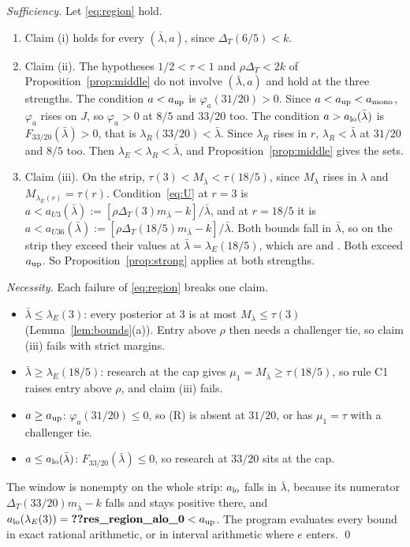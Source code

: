 \documentclass[12pt]{article}
\theoremstyle{definition}
\theoremstyle{remark}
\newcommand{\DT}{\Delta_T}
\newcommand{\lb}{\bar\lambda}
\begin{document}
\emph{Sufficiency.} Let \eqref{eq:region} hold.
\begin{enumerate}[nosep]
\item Claim (i) holds for every $(\lb,a)$, since $\DT(6/5)<k$.
\item Claim (ii). The hypotheses $1/2<\tau<1$ and $\rho\DT<2k$ of Proposition~\ref{prop:middle} do not involve
  $(\lb,a)$ and hold at the three strengths. The condition $a<a_{\rm up}$ is $\varphi_a(31/20)>0$. Since
  $a<a_{\rm up}<a_{\rm mono}$, $\varphi_a$ rises on $J$, so $\varphi_a>0$ at $8/5$ and $33/20$ too. The condition
  $a>a_{\rm lo}(\lb)$ is $F_{33/20}(\lb)>0$, that is $\lambda_R(33/20)<\lb$. Since $\lambda_R$ rises in $r$,
  $\lambda_R<\lb$ at $31/20$ and $8/5$ too. Then $\lambda_E<\lambda_R<\lb$, and Proposition~\ref{prop:middle} gives the
  sets.
\item Claim (iii). On the strip, $\tau(3)<M_{\lb}<\tau(18/5)$, since $M_\lambda$ rises in $\lambda$ and
  $M_{\lambda_E(r)}=\tau(r)$. Condition~\eqref{eq:U} at $r=3$ is $a<a_{U3}(\lb):=[\rho\DT(3)m_{\lb}-k]/\lb$, and at
  $r=18/5$ it is $a<a_{U36}(\lb):=[\rho\DT(18/5)m_{\lb}-k]/\lb$. Both bounds fall in $\lb$, so on the strip they
  exceed their values at $\lb=\lambda_E(18/5)$, which are  and . Both
  exceed $a_{\rm up}$. So Proposition~\ref{prop:strong} applies at both strengths.
\end{enumerate}

\emph{Necessity.} Each failure of \eqref{eq:region} breaks one claim.
\begin{itemize}[nosep]
\item $\lb\le\lambda_E(3)$: every posterior at $3$ is at most $M_{\lb}\le\tau(3)$ (Lemma~\ref{lem:bounds}(a)). Entry
  above $\rho$ then needs a challenger tie, so claim (iii) fails with strict margins.
\item $\lb\ge\lambda_E(18/5)$: research at the cap gives $\mu_1=M_{\lb}\ge\tau(18/5)$, so rule C1 raises entry above
  $\rho$, and claim (iii) fails.
\item $a\ge a_{\rm up}$: $\varphi_a(31/20)\le0$, so (R) is absent at $31/20$, or has $\mu_1=\tau$ with a challenger
  tie.
\item $a\le a_{\rm lo}(\lb)$: $F_{33/20}(\lb)\le0$, so research at $33/20$ sits at the cap.
\end{itemize}
The window is nonempty on the whole strip: $a_{\rm lo}$ falls in $\lb$, because its numerator
$\DT(33/20)m_{\lb}-k$ falls and stays positive there, and $a_{\rm lo}(\lambda_E(3))=\reg{res_region_alo_0}<a_{\rm up}$.
The program evaluates every bound in exact rational arithmetic, or in interval arithmetic where $e$ enters. \qed
\end{document}
